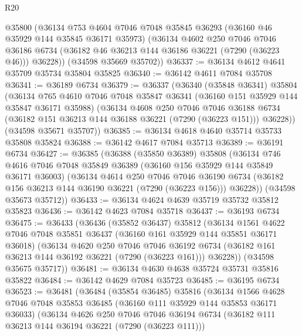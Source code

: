 \begin{lexlean}{R20}
\begin{coremodule}
{      @35800
      (@36134
        @753
        @4604
        @7046
        @7048
        @35845
        @36293
        (@36160 @46 @35929 @144 @35845 @36171 @35973)
        (@36134
          @4602
          @250
          @7046
          @7046
          @36186
          @6734
          (@36182 @46 @36213 @144 @36186 @36221 (@7290 (@36223 @46)))
          @36228))
      (@34598 @35669 @35702))
@36337 := @36134 @4612 @4641 @35709 @35734 @35804 @35825
@36340 := @36142 @4611 @7084 @35708
@36341 := @36189 @6734
@36379 := @36337
    (@36340
      (@35848 @36341)
      @35804
      (@36134
        @765
        @4610
        @7046
        @7048
        @35847
        @36341
        (@36160 @151 @35929 @144 @35847 @36171 @35988)
        (@36134
          @4608
          @250
          @7046
          @7046
          @36188
          @6734
          (@36182 @151 @36213 @144 @36188 @36221 (@7290 (@36223 @151)))
          @36228))
      (@34598 @35671 @35707))
@36385 := @36134 @4618 @4640 @35714 @35733 @35808 @35824
@36388 := @36142 @4617 @7084 @35713
@36389 := @36191 @6734
@36427 := @36385
    (@36388
      (@35850 @36389)
      @35808
      (@36134
        @746
        @4616
        @7046
        @7048
        @35849
        @36389
        (@36160 @156 @35929 @144 @35849 @36171 @36003)
        (@36134
          @4614
          @250
          @7046
          @7046
          @36190
          @6734
          (@36182 @156 @36213 @144 @36190 @36221 (@7290 (@36223 @156)))
          @36228))
      (@34598 @35673 @35712))
@36433 := @36134 @4624 @4639 @35719 @35732 @35812 @35823
@36436 := @36142 @4623 @7084 @35718
@36437 := @36193 @6734
@36475 := @36433
    (@36436
      (@35852 @36437)
      @35812
      (@36134
        @1561
        @4622
        @7046
        @7048
        @35851
        @36437
        (@36160 @161 @35929 @144 @35851 @36171 @36018)
        (@36134
          @4620
          @250
          @7046
          @7046
          @36192
          @6734
          (@36182 @161 @36213 @144 @36192 @36221 (@7290 (@36223 @161)))
          @36228))
      (@34598 @35675 @35717))
@36481 := @36134 @4630 @4638 @35724 @35731 @35816 @35822
@36484 := @36142 @4629 @7084 @35723
@36485 := @36195 @6734
@36523 := @36481
    (@36484
      (@35854 @36485)
      @35816
      (@36134
        @1566
        @4628
        @7046
        @7048
        @35853
        @36485
        (@36160 @111 @35929 @144 @35853 @36171 @36033)
        (@36134
          @4626
          @250
          @7046
          @7046
          @36194
          @6734
          (@36182 @111 @36213 @144 @36194 @36221 (@7290 (@36223 @111)))
}
\end{coremodule}
\end{lexlean}
